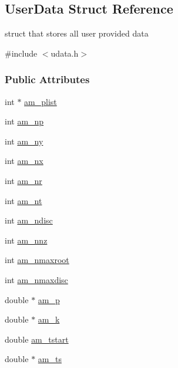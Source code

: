 \hypertarget{struct_user_data}{}\subsection{User\+Data Struct Reference}
\label{struct_user_data}


struct that stores all user provided data  




{\ttfamily \#include $<$udata.\+h$>$}

\subsubsection*{Public Attributes}
\begin{DoxyCompactItemize}
\item 
int $\ast$ \hyperlink{struct_user_data_a122fcb4f213656e29d30e1e8713fcf1c}{am\+\_\+plist}
\item 
int \hyperlink{struct_user_data_a1b32993ff88dfae4dd2aab311c24cc26}{am\+\_\+np}
\item 
int \hyperlink{struct_user_data_a1c8d4eb301c60c34dc4870faca7ce5a4}{am\+\_\+ny}
\item 
int \hyperlink{struct_user_data_a00ba9cf99f8f02b663241bb76b76ce96}{am\+\_\+nx}
\item 
int \hyperlink{struct_user_data_aa56d89d6184e84681395d1b00069f883}{am\+\_\+nr}
\item 
int \hyperlink{struct_user_data_a08ea6ecb241cd86a6f171761a48e27dd}{am\+\_\+nt}
\item 
int \hyperlink{struct_user_data_adc94a5ce0a5314355aae8e05060c13da}{am\+\_\+ndisc}
\item 
int \hyperlink{struct_user_data_a43ad1c7f840dc744be4251902a4ae91d}{am\+\_\+nnz}
\item 
int \hyperlink{struct_user_data_a2c6b0a170bd534f68ab5b216629055a8}{am\+\_\+nmaxroot}
\item 
int \hyperlink{struct_user_data_a57c79c232bf5d88b7dd1b3cb5947366b}{am\+\_\+nmaxdisc}
\item 
double $\ast$ \hyperlink{struct_user_data_a1a679b0e8dfea7d284d777c937d8d13e}{am\+\_\+p}
\item 
double $\ast$ \hyperlink{struct_user_data_a7b59855746129befdcfe9f3c8a4d2a4c}{am\+\_\+k}
\item 
double \hyperlink{struct_user_data_a230439d483e6fde07a6fe687219060c2}{am\+\_\+tstart}
\item 
double $\ast$ \hyperlink{struct_user_data_a368434a79bdb1655bef3adc552834ddc}{am\+\_\+ts}

\end{DoxyCompactItemize}
